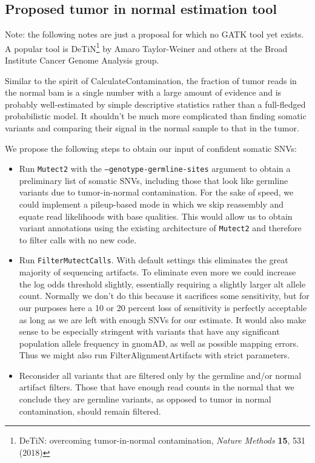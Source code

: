\documentclass[nofootinbib,amssymb,amsmath]{revtex4}
\newcommand{\code}[1]{\texttt{#1}}
\begin{document}
\subsection{Proposed tumor in normal estimation tool}

Note: the following notes are just a proposal for which no GATK tool yet exists.  A popular tool is DeTiN\footnote{DeTiN: overcoming tumor-in-normal contamination, \textit{Nature Methods} \textbf{15}, 531 (2018)} by Amaro Taylor-Weiner and others at the Broad Institute Cancer Genome Analysis group.

Similar to the spirit of CalculateContamination, the fraction of tumor reads in the normal bam is a single number with a large amount of evidence and is probably well-estimated by simple descriptive statistics rather than a full-fledged probabilistic model.  It shouldn't be much more complicated than finding somatic variants and comparing their signal in the normal sample to that in the tumor.

We propose the following steps to obtain our input of confident somatic SNVs:
\begin{itemize}
\item Run \code{Mutect2} with the \code{--genotype-germline-sites} argument to obtain a preliminary list of somatic SNVs, including those that look like germline variants due to tumor-in-normal contamination.  For the sake of speed, we could implement a pileup-based mode in which we skip reassembly and equate read likelihoods with base qualities.  This would allow us to obtain variant annotations using the existing architecture of \code{Mutect2} and therefore to filter calls with no new code.  
\item Run \code{FilterMutectCalls}.  With default settings this eliminates the great majority of sequencing artifacts.  To eliminate even more we could increase the log odds threshold slightly, essentially requiring a slightly larger alt allele count.  Normally we don't do this because it sacrifices some sensitivity, but for our purposes here a 10 or 20 percent loss of sensitivity is perfectly acceptable as long as we are left with enough SNVs for our estimate.  It would also make sense to be especially stringent with variants that have any significant population allele frequency in gnomAD, as well as possible mapping errors.  Thus we might also run FilterAlignmentArtifacts with strict parameters.
\item Reconsider all variants that are filtered only by the germline and/or normal artifact filters.  Those that have enough read counts in the normal that we conclude they are germline variants, as opposed to tumor in normal contamination, should remain filtered.  
\end{itemize}
\end{document}
